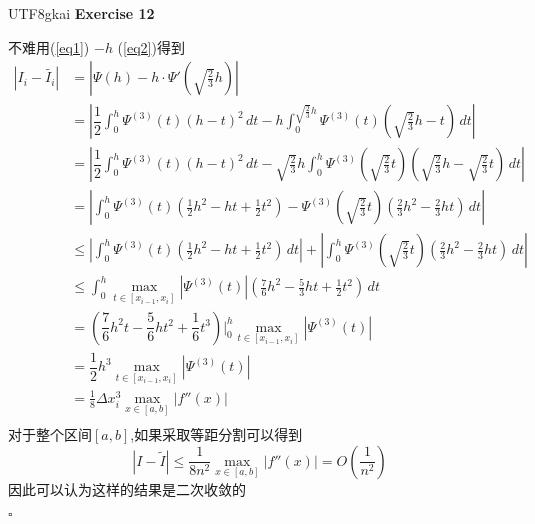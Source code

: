 \documentclass{article}
\newenvironment{exercise}[1]{%
{\textbf{Exercise #1} \\ 
    }
}{
  \hfill $\square$ 
  \par\bigskip 
}
\newcommand{\parameter}[1]{\left(#1\right)}
\newcommand{\abs}[1]{\left|#1\right|}
\begin{document}
\begin{CJK}{UTF8}{gkai}
\begin{exercise}{12}
    不难用(\ref{eq1}) $- h$ (\ref{eq2})得到
    \[
    \begin{aligned}
        \abs{I_i - \tilde{I_i}} &= \abs{\varPsi(h) - h\cdot \varPsi'\parameter{\sqrt{\frac{2}{3}} h} }\\
        &= \abs{\dfrac{1}{2}\int_{0}^{h}\varPsi^{(3)}(t)(h - t)^2 \, dt - h\int_{0}^{\sqrt{\frac{2}{3}} h}\varPsi^{(3)}(t)(\sqrt{\frac{2}{3}}h -t)\, dt} \\
        &= \abs{\dfrac{1}{2}\int_{0}^{h}\varPsi^{(3)}(t)(h - t)^2 \, dt - \sqrt{\frac{2}{3}}h\int_{0}^{h}\varPsi^{(3)}(\sqrt{\frac{2}{3}}t)(\sqrt{\frac{2}{3}}h - \sqrt{\frac{2}{3}}t)\, dt} \\  
        &=  \abs{\int_{0}^{h} \varPsi^{(3)}(t) (\frac{1}{2}h^2 - ht + \frac{1}{2}t^2) - \varPsi^{(3)}(\sqrt{\frac{2}{3}}t)(\frac{2}{3}h^2 - \frac{2}{3}ht)\,dt}\\
        &\leq \abs{\int_{0}^{h} \varPsi^{(3)}(t) (\frac{1}{2}h^2 - ht + \frac{1}{2}t^2)\,dt} + \abs{\int_{0}^{h}\varPsi^{(3)}(\sqrt{\frac{2}{3}}t)(\frac{2}{3}h^2 - \frac{2}{3}ht)\,dt}\\
        &\leq \int_{0}^{h} \max_{t\in[x_{i - 1},x_i]}\abs{\varPsi^{(3)}(t)} (\frac{7}{6}h^2 - \frac{5}{3}ht + \frac{1}{2}t^2)\, dt\\
        &= (\dfrac{7}{6}h^2 t - \dfrac{5}{6}h t^2+ \dfrac{1}{6} t^3)|_0^h \max_{t\in[x_{i - 1},x_i]}\abs{\varPsi^{(3)}(t)}\\
        &= \dfrac{1}{2}h^3 \max_{t\in[x_{i - 1},x_i]}\abs{\varPsi^{(3)}(t)}\\
        &= \frac{1}{8}\Delta x_i^3 \max_{x \in [a,b]} |f''(x)|\\
    \end{aligned}
    \]
    对于整个区间$[a,b]$,如果采取等距分割可以得到
    \[|I - \tilde{I}|\leq  \frac{1}{8n^2}\max_{x \in [a,b]} |f''(x)| = O(\dfrac{1}{n^2})\]
    因此可以认为这样的结果是二次收敛的
\end{exercise}


\end{CJK}
\end{document}
